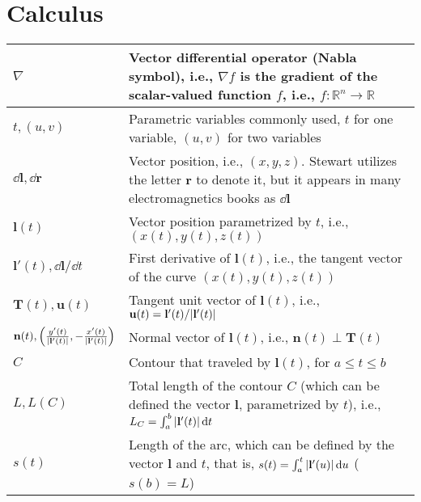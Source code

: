 \documentclass{article}
\begin{document}
\section{Calculus}
\begin{xltabular}{\textwidth}{XX}
    \(\nabla\) & Vector differential operator (Nabla symbol), i.e., \(\nabla f\) is the gradient of the scalar-valued function \(f\), i.e., \(f: \mathbb{R}^n \rightarrow \mathbb{R}\) \\ \hline
    \(t, (u,v)\) & Parametric variables commonly used, \(t\) for one variable, \((u,v)\) for two variables\cite{stewartCalculus2011}\\ \hline
    \(\dd{\mathbf{l}}, \dd{\mathbf{r}}\) & Vector position, i.e., \((x, y, z)\). Stewart \cite{stewartCalculus2011} utilizes the letter \(\mathbf{r}\) to denote it, but it appears in many electromagnetics books as \(\dd{\mathbf{l}}\) \\ \hline
    \(\mathbf{l}(t)\) & Vector position parametrized by \(t\), i.e., \((x(t), y(t), z(t))\) \cite{stewartCalculus2011,ramoFieldsWavesCommunication1994}\\ \hline
    \(\mathbf{l}'(t), \dd{\mathbf{l}}/\dd{t}\) & First derivative of \(\mathbf{l}(t)\), i.e., the tangent vector of the curve \((x(t), y(t), z(t))\) \cite{stewartCalculus2011}\\ \hline
    \(\mathbf{T}(t), \mathbf{u}(t)\) & Tangent unit vector of \(\mathbf{l}(t)\), i.e., \newline  \(\mathbf{u}(t) = \mathbf{l}'(t)/\abs{\mathbf{l}'(t)}\)\cite{stewartCalculus2011,kreyszigAdvancedEngineeringMathematics2008}\\ \hline
    \(\mathbf{n}(t), \left( \frac{y'(t)}{\abs{\mathbf{l}'(t)}}, -\frac{x'(t)}{\abs{\mathbf{l}'(t)}} \right)\) & Normal vector of \(\mathbf{l}(t)\), i.e., \newline \(\mathbf{n}(t)\perp \mathbf{T}(t) \)\cite{stewartCalculus2011}\\ \hline
    \(C\)& Contour that traveled by \(\mathbf{l}(t)\), for \(a \leq t \leq b\) \cite{stewartCalculus2011}\\ \hline
    \(L, L(C)\) & Total length of the contour \(C\) (which can be defined the vector \(\mathbf{l}\), parametrized by \(t\)), i.e., \(L_C = \int_a^b \abs{\mathbf{l}'(t)} \dd{t}\)\cite{stewartCalculus2011}\\ \hline
    \(s(t)\) & Length of the arc, which can be defined by the vector \(\mathbf{l}\) and \(t\), that is, \(s(t) = \int_a^t \abs{\mathbf{l}'(u)} \dd{u}\) (\(s(b) = L\))\cite{stewartCalculus2011}\\ \hline

\end{xltabular}
\end{document}
